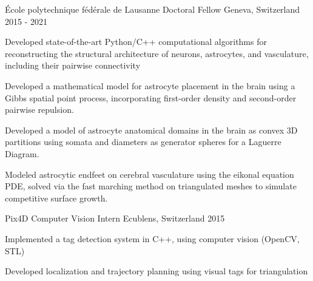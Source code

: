\begin{cventries}


\cventry
{École polytechnique fédérale de Lausanne}
{Doctoral Fellow}
{Geneva, Switzerland}
{2015 - 2021}
{
\begin{cvitems}
\item{Developed state-of-the-art Python/C++ computational algorithms for reconstructing the structural architecture of neurons, astrocytes, and vasculature, including their pairwise connectivity}
\item{Developed a mathematical model for astrocyte placement in the brain using a Gibbs spatial point process, incorporating first-order density and second-order pairwise repulsion.}
\item{Developed a model of astrocyte anatomical domains in the brain as convex 3D partitions using somata and diameters as generator spheres for a Laguerre Diagram.}
\item{Modeled astrocytic endfeet on cerebral vasculature using the eikonal equation PDE, solved via the fast marching method on triangulated meshes to simulate competitive surface growth.}
\end{cvitems}
}



\cventry
{Pix4D} %
{Computer Vision Intern} %
{Ecublens, Switzerland} %
{2015 } %
{ %
\begin{cvitems}
\item {Implemented a tag detection system in C++, using computer vision (OpenCV, STL)}
\item {Developed localization and trajectory planning using visual tags for triangulation}
\end{cvitems}
}


\end{cventries}
